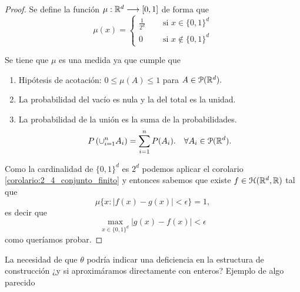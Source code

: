 \begin{proof}
    Se define la función $\mu : \mathbb{R}^d \longrightarrow [0,1]$ de forma que 
    \begin{equation}
        \mu(x) = 
      \left \{
    \begin{aligned}
      \frac{1}{2^d} \quad &\text{ si } x \in \{0,1\}^d \\
      0 \quad & \text{ si } x \notin \{0,1\}^d 
    \end{aligned}
  \right .
    \end{equation}

    Se tiene que $\mu$ es una medida ya que cumple que 
    \begin{enumerate}
        \item Hipótesis de acotación: $0 \leq \mu(A) \leq 1$ para $A \in \mathcal{P}(\mathbb{R}^d).$
        \item La probabilidad del vacío es nula y la del  total es la unidad. 
        \item La probabilidad de la unión es la suma de la probabilidades. 
        \begin{equation}
            P\left(
                \cup_{i=1}^n A_i
            \right)
            = \sum_{i=1}^n P(A_i).
            \quad
            \forall A_i \in  \mathcal{P}(\mathbb{R}^d).
        \end{equation}
    \end{enumerate}  

    Como la cardinalidad de $\{0,1\}^d$ es $2^d$
    podemos aplicar el corolario \ref{corolario:2_4_conjunto_finito}
    y entonces sabemos que  existe $f\in \mathcal{H}(\mathbb{R}^d,\mathbb{R})$ tal que 
    \begin{equation}
            \mu\{ 
                x:
                |f(x) - g(x)| 
                < \epsilon
            \}
            = 1,
    \end{equation} 
    es decir que 
    \begin{equation}
        \max_{x \in \{ 0,1\}^d} |g(x) - f(x)|
        < \epsilon
    \end{equation}
    como queríamos probar. 
\end{proof}
\iconoAclaraciones \textcolor{dark_green}{ La necesidad de que $\theta$ podría indicar una deficiencia en la estructura de construcción ¿y si aproximáramos directamente con enteros?  
Ejemplo de algo parecido  \cite{Wang_2022}
}



